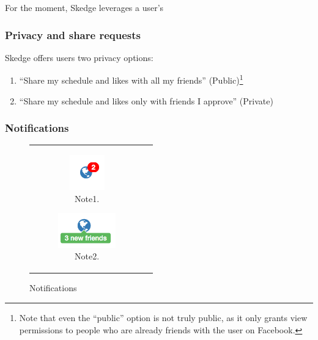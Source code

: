   For the moment, Skedge leverages a user's 

  \subsubsection{Privacy and share requests}

  Skedge offers users two privacy options:

  \begin{enumerate}
  \item ``Share my schedule and likes with all my friends'' (Public)\footnote{Note that even the ``public'' option is not truly public, as it only grants view permissions to people who are already friends with the user on Facebook.}
  \item ``Share my schedule and likes only with friends I approve'' (Private)
  \end{enumerate}

  
  

  \subsubsection{Notifications}

  \begin{figure}[H]
    \centering
    \begin{tabular}{c c}
      \begin{subfigure}[w]{3cm}
        \centering
        \includegraphics[height=1.5cm]{images/skedge/social-note1}
        \caption{Note1.} \label{fig:sk-social-note1}
      \end{subfigure}
      
      \begin{subfigure}[w]{3cm}
        \centering
        \includegraphics[height=1.5cm]{images/skedge/social-note2}
        \caption{Note2.} \label{fig:sk-social-note2}
      \end{subfigure}
    \end{tabular}
    \caption{Notifications}
  \end{figure}

